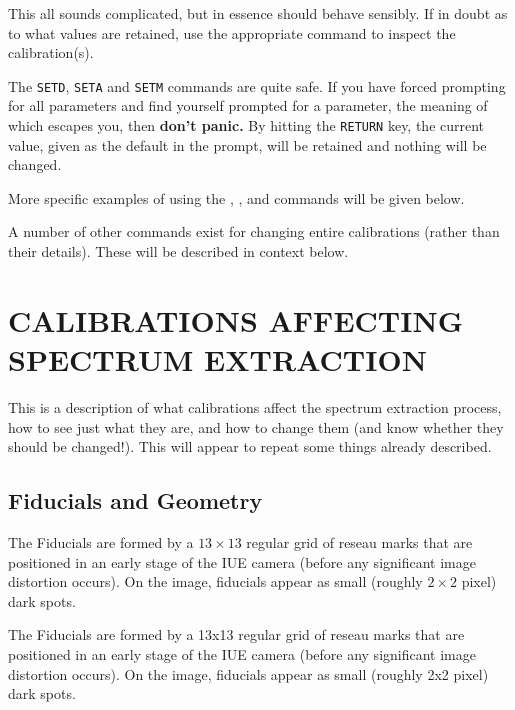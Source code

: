 This all sounds complicated, but in essence should behave sensibly.  If in
doubt as to what values are retained, use the appropriate
 command to inspect the calibration(s).

The \verb+SETD+, \verb+SETA+ and \verb+SETM+ commands are quite safe.  If you
have forced prompting for all parameters and find yourself prompted for a
parameter, the meaning of which escapes you, then {\bf don't panic.}  By
hitting the \verb+RETURN+ key, the current value, given as the default in the
prompt, will be retained and nothing will be changed.

More specific examples of using the ,
, 
 and  commands will be given below.

A number of other commands exist for changing entire calibrations (rather than
their details). These will be described in context below.


\section{\label{se:extr_calib}CALIBRATIONS
         AFFECTING SPECTRUM EXTRACTION}

This is a description of what calibrations affect the spectrum
extraction process, how to see just what they are, and how to change them
(and know whether they should be changed!)\@.  This will appear to repeat some
things already described.


\subsection{Fiducials and Geometry}

\begin{latexonly}
The Fiducials are formed by a $13\times 13$ regular grid of reseau marks that
are positioned in an early stage of the IUE camera (before any significant
image distortion occurs). On the image, fiducials appear as small (roughly
$2\times 2$ pixel) dark spots.
\end{latexonly}

\begin{htmlonly}
The Fiducials are formed by a 13x13 regular grid of reseau marks that
are positioned in an early stage of the IUE camera (before any significant
image distortion occurs). On the image, fiducials appear as small (roughly
2x2 pixel) dark spots.
\end{htmlonly}

